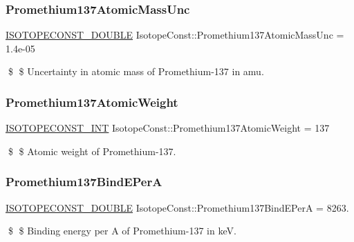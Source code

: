 \subsubsection{\texorpdfstring{Promethium137\+Atomic\+Mass\+Unc}{Promethium137AtomicMassUnc}}
{\footnotesize\ttfamily \mbox{\hyperlink{group___isotope_const-_macros_ga8f45a7272ce02c0b4c65c44636ed719a}{I\+S\+O\+T\+O\+P\+E\+C\+O\+N\+S\+T\+\_\+\+D\+O\+U\+B\+LE}} Isotope\+Const\+::\+Promethium137\+Atomic\+Mass\+Unc = 1.\+4e-\/05}

\$ \$ Uncertainty in atomic mass of Promethium-\/137 in amu. \mbox{\label{group___isotope_const-_promethium-_pm137_gaa99f44734d79ef3da8653b7e9a9aa0cb}} 
\subsubsection{\texorpdfstring{Promethium137\+Atomic\+Weight}{Promethium137AtomicWeight}}
{\footnotesize\ttfamily \mbox{\hyperlink{group___isotope_const-_macros_ga5f18360b3e99483a35c32d789e62621c}{I\+S\+O\+T\+O\+P\+E\+C\+O\+N\+S\+T\+\_\+\+I\+NT}} Isotope\+Const\+::\+Promethium137\+Atomic\+Weight = 137}

\$ \$ Atomic weight of Promethium-\/137. \mbox{\label{group___isotope_const-_promethium-_pm137_gab3c65974c363cc713df75f24c4d9e0f3}} 
\subsubsection{\texorpdfstring{Promethium137\+Bind\+E\+PerA}{Promethium137BindEPerA}}
{\footnotesize\ttfamily \mbox{\hyperlink{group___isotope_const-_macros_ga8f45a7272ce02c0b4c65c44636ed719a}{I\+S\+O\+T\+O\+P\+E\+C\+O\+N\+S\+T\+\_\+\+D\+O\+U\+B\+LE}} Isotope\+Const\+::\+Promethium137\+Bind\+E\+PerA = 8263.}

\$ \$ Binding energy per A of Promethium-\/137 in keV. \mbox{\label{group___isotope_const-_promethium-_pm137_gaa2e1557158230537bbd408e43f9ddfd3}} 
